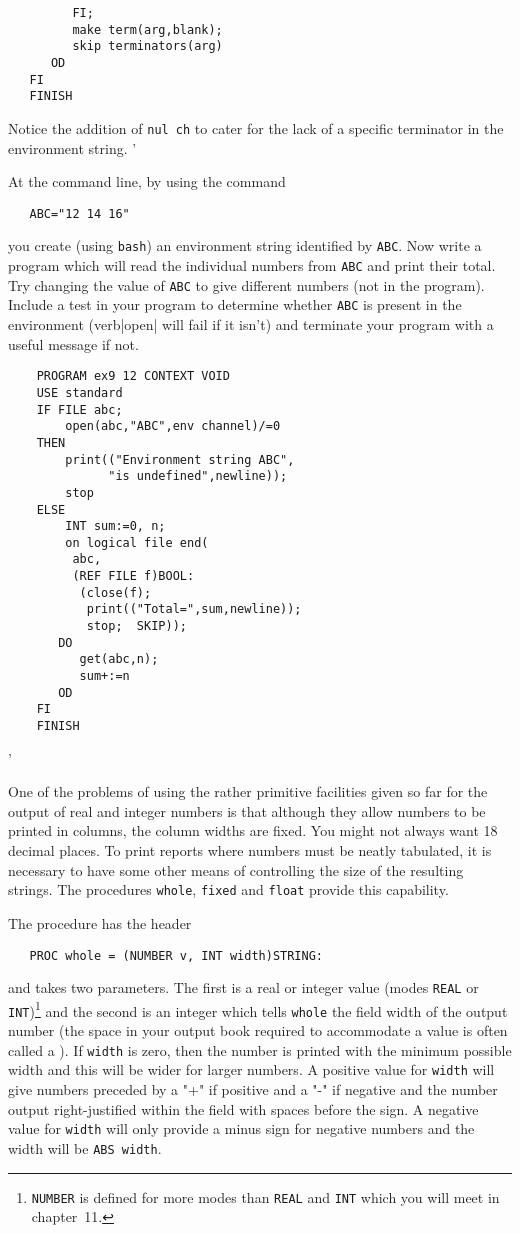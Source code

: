 \begin{exercise}
\begin{verbatim}
         FI;
         make term(arg,blank);
         skip terminators(arg)
      OD
   FI
   FINISH
\end{verbatim}
\noindent
Notice the addition of \verb|nul ch| to cater for the lack of a
specific terminator in the environment string.
'
\item At the command line, by using the command
\begin{verbatim}
   ABC="12 14 16"
\end{verbatim}
\noindent
you create (using \verb|bash|) an environment string identified by
\verb|ABC|. Now write a program which will read the individual
numbers from \verb|ABC| and print their total. Try changing the value
of \verb|ABC| to give different numbers (not in the program). Include
a test in your program to determine whether \verb|ABC| is present in
the environment (verb|open| will fail if it isn't) and terminate your
program with a useful message if not. \ans \ %
\begin{verbatim}
    PROGRAM ex9 12 CONTEXT VOID
    USE standard
    IF FILE abc;
        open(abc,"ABC",env channel)/=0
    THEN
        print(("Environment string ABC",
              "is undefined",newline));
        stop
    ELSE
        INT sum:=0, n;
        on logical file end(
         abc,
         (REF FILE f)BOOL:
          (close(f);
           print(("Total=",sum,newline));
           stop;  SKIP));
       DO
          get(abc,n);
          sum+:=n
       OD
    FI
    FINISH
\end{verbatim}
'
\end{exercise}

One of the problems of using the rather primitive facilities given
so far for the output of real and integer numbers is that although
they allow numbers to be printed in columns, the column widths are
fixed.  You might not always want 18 decimal places. To print reports
where numbers must be neatly tabulated, it is necessary to have some
other means of controlling the size of the resulting strings. The
procedures \texttt{whole}, \texttt{fixed} and \texttt{float} provide
this capability.

The procedure  has the header
\begin{verbatim}
   PROC whole = (NUMBER v, INT width)STRING:
\end{verbatim}
\noindent
and takes two parameters. The first is a real or integer value (modes
\verb|REAL| or \verb|INT|)\footnote{\texttt{NUMBER} is defined for
more modes than \texttt{REAL} and \texttt{INT} which you will meet in
chapter~11.} and the second is an integer which tells \verb|whole|
the field width of the output number (the space in your output book
required to accommodate a value is often called a ). If
\verb|width| is zero, then the number is printed with the minimum
possible width and this will be wider for larger numbers. A positive
value for \verb|width| will give numbers preceded by a "+" if
positive and a "-" if negative and the number output right-justified
within the field with spaces before the sign. A negative value for
\verb|width| will only provide a minus sign for negative numbers and
the width will be \verb|ABS width|.


